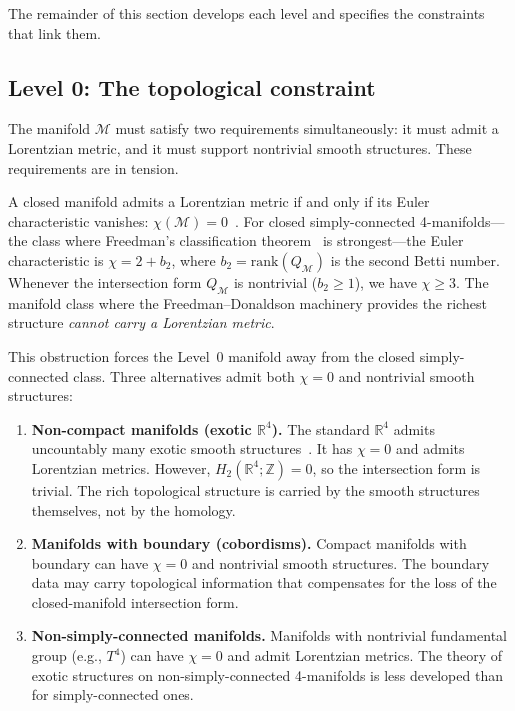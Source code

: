 \documentclass[12pt,a4paper]{article}
\theoremstyle{definition}
\theoremstyle{remark}
\begin{document}
The remainder of this section develops each level and specifies the
constraints that link them.

\subsection{Level 0: The topological constraint}
\label{sec:level0}

The manifold $\mathcal{M}$ must satisfy two requirements simultaneously:
it must admit a Lorentzian metric, and it must support nontrivial smooth
structures. These requirements are in tension.

A closed manifold admits a Lorentzian metric if and only if its Euler
characteristic vanishes: $\chi(\mathcal{M}) = 0$~\cite{geroch}. For
closed simply-connected 4-manifolds---the class where Freedman's
classification theorem~\cite{freedman} is strongest---the Euler
characteristic is $\chi = 2 + b_2$, where $b_2 = \mathrm{rank}(Q_\mathcal{M})$
is the second Betti number. Whenever the intersection form $Q_\mathcal{M}$ is
nontrivial ($b_2 \geq 1$), we have $\chi \geq 3$. The manifold class
where the Freedman--Donaldson machinery provides the richest structure
\emph{cannot carry a Lorentzian metric}.

This obstruction forces the Level~0 manifold away from the closed
simply-connected class. Three alternatives admit both $\chi = 0$ and
nontrivial smooth structures:

\begin{enumerate}
\item \textbf{Non-compact manifolds (exotic $\mathbb{R}^4$).} The
standard $\mathbb{R}^4$ admits uncountably many exotic smooth
structures~\cite{donaldson,taubes}. It has $\chi = 0$ and admits
Lorentzian metrics. However, $H_2(\mathbb{R}^4;\mathbb{Z}) = 0$, so
the intersection form is trivial. The rich topological structure is
carried by the smooth structures themselves, not by the homology.

\item \textbf{Manifolds with boundary (cobordisms).} Compact manifolds
with boundary can have $\chi = 0$ and nontrivial smooth structures. The
boundary data may carry topological information that compensates for the
loss of the closed-manifold intersection form.

\item \textbf{Non-simply-connected manifolds.} Manifolds with nontrivial
fundamental group (e.g., $T^4$) can have $\chi = 0$ and admit Lorentzian
metrics. The theory of exotic structures on non-simply-connected
4-manifolds is less developed than for simply-connected ones.
\end{enumerate}
\end{document}
